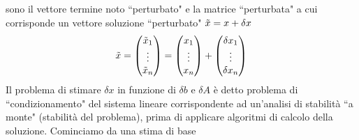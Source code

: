 sono il vettore termine noto ``perturbato" e la matrice ``perturbata" a cui corrisponde un vettore soluzione ``perturbato" $\Tilde{x}=x+\delta x$
\begin{equation*}
    \Tilde{x}= 
    \begin{pmatrix}
    \Tilde{x}_1\\  
    \vdots\\ 
    \Tilde{x}_n
\end{pmatrix} =
\begin{pmatrix}
    x_1\\  
    \vdots\\ 
    x_n
\end{pmatrix} + 
\begin{pmatrix}
    \delta x_1\\  
    \vdots\\ 
    \delta x_n
\end{pmatrix}
\end{equation*}
Il problema di stimare $\delta x$ in funzione di $\delta b$ e $\delta A$ è detto problema di ``condizionamento" del sistema lineare corrispondente ad un'analisi di stabilità ``a monte" (stabilità del problema), prima di applicare algoritmi di calcolo della soluzione.
Cominciamo da una stima di base

